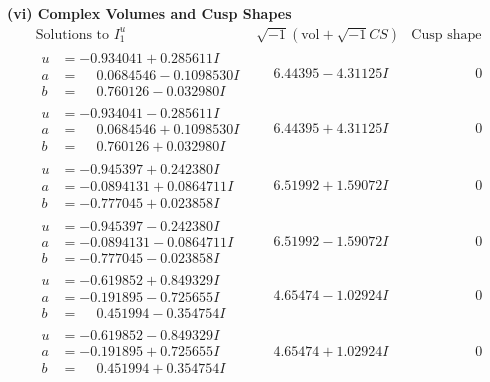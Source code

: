 \documentclass[1p]{elsarticle_modified}
\theoremstyle{definition}
\newcommand{\I}{\sqrt{-1}}
\begin{document}
\newpage\flushleft \textbf{(vi) Complex Volumes and Cusp Shapes}
$$\begin{array}{c|c|c}  
\text{Solutions to }I^u_{1}& \I (\text{vol} + \sqrt{-1}CS) & \text{Cusp shape}\\
 \hline 
\begin{aligned}
u &= -0.934041 + 0.285611 I \\
a &= \phantom{-}0.0684546 - 0.1098530 I \\
b &= \phantom{-}0.760126 - 0.032980 I\end{aligned}
 & \phantom{-}6.44395 - 4.31125 I & \phantom{-0.000000 } 0 \\ \hline\begin{aligned}
u &= -0.934041 - 0.285611 I \\
a &= \phantom{-}0.0684546 + 0.1098530 I \\
b &= \phantom{-}0.760126 + 0.032980 I\end{aligned}
 & \phantom{-}6.44395 + 4.31125 I & \phantom{-0.000000 } 0 \\ \hline\begin{aligned}
u &= -0.945397 + 0.242380 I \\
a &= -0.0894131 + 0.0864711 I \\
b &= -0.777045 + 0.023858 I\end{aligned}
 & \phantom{-}6.51992 + 1.59072 I & \phantom{-0.000000 } 0 \\ \hline\begin{aligned}
u &= -0.945397 - 0.242380 I \\
a &= -0.0894131 - 0.0864711 I \\
b &= -0.777045 - 0.023858 I\end{aligned}
 & \phantom{-}6.51992 - 1.59072 I & \phantom{-0.000000 } 0 \\ \hline\begin{aligned}
u &= -0.619852 + 0.849329 I \\
a &= -0.191895 - 0.725655 I \\
b &= \phantom{-}0.451994 - 0.354754 I\end{aligned}
 & \phantom{-}4.65474 - 1.02924 I & \phantom{-0.000000 } 0 \\ \hline\begin{aligned}
u &= -0.619852 - 0.849329 I \\
a &= -0.191895 + 0.725655 I \\
b &= \phantom{-}0.451994 + 0.354754 I\end{aligned}
 & \phantom{-}4.65474 + 1.02924 I & \phantom{-0.000000 } 0 \\ \hline\begin{aligned}

\end{aligned}
\end{array}$$
\end{document}
